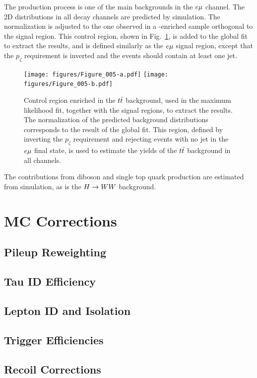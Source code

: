 The \ttbar production process is one of the main backgrounds in the $e\mu$ channel.
The 2D distributions in all decay channels are predicted by simulation. The normalization is
adjusted to the one observed in a \ttbar-enriched sample orthogonal to the signal region. This control
region, shown in Fig.~\ref{fig:CR2},
is added to the global fit to extract the results, and is defined similarly as the $e\mu$ signal region, except that the $p_\zeta$ requirement
is inverted and the events should contain at least one jet.

\begin{figure}[htb]
\centering
     \texttt{[image: figures/Figure\_005-a.pdf]}
     \texttt{[image: figures/Figure\_005-b.pdf]}
     \caption{Control region enriched in the $t\bar{t}$ background, used in the maximum likelihood fit, together with the signal regions, to extract the results. The normalization of the predicted background distributions corresponds to the result of the global fit. This region, defined by inverting the $p_\zeta$ requirement and rejecting events with no jet in the $e\mu$ final state,  is used to estimate the
yields of the $t\bar{t}$ background in all channels.}
     \label{fig:CR2}
\end{figure}

The contributions from diboson and single top quark production are estimated from simulation, as is the $H\to WW$ background.

\pagebreak

\section{MC Corrections}
\subsection{Pileup Reweighting}
\subsection{Tau ID Efficiency}
\subsection{Lepton ID and Isolation}
\subsection{Trigger Efficiencies}
\subsection{Recoil Corrections}
